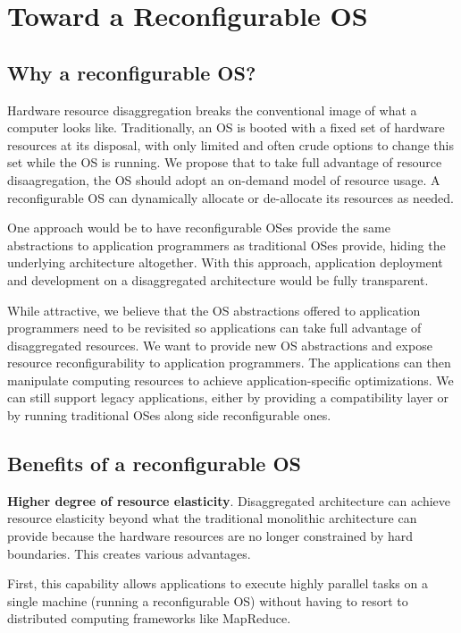 \section{Toward a Reconfigurable OS}
\label{sec:reconfig_os}
\subsection{Why a reconfigurable OS?}
Hardware resource disaggregation breaks the conventional image of
what a computer looks like.  Traditionally, an OS is booted with a
fixed set of hardware resources at its disposal, with only limited
and often crude options to change this set while the OS is running.
We propose that to take full advantage of resource disaagregation,
the OS should adopt an on-demand model of resource usage. A
reconfigurable OS can dynamically allocate or de-allocate its
resources as needed.

One approach would be to have reconfigurable OSes provide the
same abstractions to application programmers as traditional
OSes provide, hiding the underlying architecture altogether.
With this approach, application deployment and development
on a disaggregated architecture would be fully transparent.

While attractive, we believe that the OS abstractions offered to
application programmers need to be revisited so applications
can take full advantage of disaggregated resources.
We want to provide new OS abstractions and expose
resource reconfigurability to application programmers.
The applications can then manipulate computing resources to
achieve application-specific optimizations.
We can still support legacy applications, either by providing
a compatibility layer or by running traditional OSes along
side reconfigurable ones.

\subsection{Benefits of a reconfigurable OS}
\label{sec:benefits}
\noindent
\textbf{Higher degree of resource elasticity}.
Disaggregated architecture can achieve resource elasticity beyond
what the traditional monolithic architecture can provide because
the hardware resources are no longer constrained by hard boundaries.
This creates various advantages.

First, this capability allows applications to execute highly parallel
tasks on a single machine (running a reconfigurable OS) without
having to resort to distributed computing frameworks like MapReduce.

